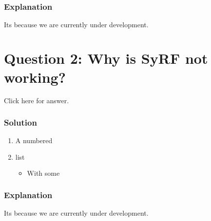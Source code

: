 \documentclass[
]{book}
\providecommand{\tightlist}{%
  \setlength{\itemsep}{0pt}\setlength{\parskip}{0pt}}
\begin{document}
\hypertarget{explanation}{%
\subsubsection{Explanation}\label{explanation}}

Its because we are currently under development.

\hypertarget{question-2-why-is-syrf-not-working}{%
\section{Question 2: Why is SyRF not working?}\label{question-2-why-is-syrf-not-working}}

Click here for answer.

\hypertarget{solution-1}{%
\subsubsection{Solution}\label{solution-1}}

\begin{enumerate}
\def\labelenumi{\arabic{enumi}.}
\tightlist
\item
  A numbered
\item
  list

  \begin{itemize}
  \tightlist
  \item
    With some
  \end{itemize}
\end{enumerate}

\hypertarget{explanation-1}{%
\subsubsection{Explanation}\label{explanation-1}}

Its because we are currently under development.

  
\end{document}
